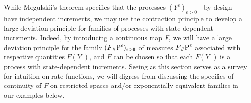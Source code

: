 While Mogulskii's theorem specifies that the processes $(Y^\epsilon)_{\epsilon>0}$---by design---have independent increments, we may use the contraction principle \cite[Theorem 4.2.1]{dembo2010} to develop a large deviation principle for families of processes with state-dependent increments.
Indeed, by introducing a continuous map $F$, we will have a large deviation principle for the family $(\push{\Prb^\epsilon}{F})_{\epsilon>0}$ of measures $\push{\Prb^\epsilon}{F}$ associated with respective quantities $F(Y^\epsilon)$, and $F$ can be chosen so that each $F(Y^\epsilon)$ is a process with state-dependent increments.
Seeing as this section serves as a survey for intuition on rate functions, we will digress from discussing the specifics of continuity of $F$ on restricted spaces and/or exponentially equivalent families in our examples below.



